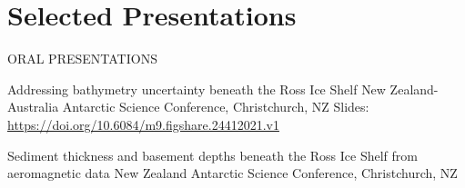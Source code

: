 \documentclass{ExpressiveResume}
\begin{document}
\section{Selected Presentations}
\noindent ORAL PRESENTATIONS \newline
\begin{cventries}
    {Addressing bathymetry uncertainty beneath the Ross Ice Shelf}
    {New Zealand-Australia Antarctic Science Conference, Christchurch, NZ}
    {Slides: \url{https://doi.org/10.6084/m9.figshare.24412021.v1}}
    {}
    {}

    {Sediment thickness and basement depths beneath the Ross Ice Shelf from aeromagnetic data}
    {New Zealand Antarctic Science Conference, Christchurch, NZ}
    {}
    {}

\end{cventries}
\end{document}
